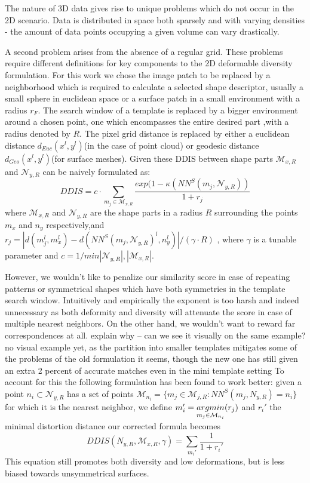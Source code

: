 \documentclass[10pt,twocolumn,letterpaper]{article}
\begin{document}
The nature of 3D data gives rise to unique problems which do not occur in the 2D scenario. Data is distributed in space both sparsely and with varying densities - the amount of data points occupying a given volume can vary drastically.

A second problem arises from the absence of a regular grid. These problems require different definitions for key components to the 2D deformable diversity formulation. For this work we chose the image patch to be replaced by a neighborhood which is required to calculate a selected shape descriptor, usually a small sphere in euclidean space or a surface patch in a small environment with a radius $r_F$. The search window  of a template is replaced by a bigger environment around a chosen point, one which encompasses the entire desired part ,with a radius denoted by $R$. The pixel grid distance is replaced by either a euclidean distance $d_{Euc}(x^l,y^l)$(in the case of point cloud) or geodesic distance $d_{Geo}(x^l,y^l)$(for surface meshes).
Given these DDIS  between shape parts $\mathcal{M}_{x,R}$ and $\mathcal{N}_{y,R}$ can be naively formulated as:
\begin{equation}
DDIS=c\cdot\sum_{m_j\in\mathcal{M}_{x,R}}\frac{exp(1-\kappa(NN^S(m_j,\mathcal{N}_{y,R}))}{1+r_j}
\end{equation}
where $\mathcal{M}_{x,R}$ and $\mathcal{N}_{y,R}$ are the shape parts in a radius $R$ surrounding the points $m_x$ and $n_y$ respectively,and $r_j=|d(m_j^l,m_x^l)-d(NN^S(m_j,\mathcal{N}_{y,R})^l,n_y^l)|/(\gamma\cdot R)$ , where $\gamma$ is a tunable parameter and $c=1/min{|\mathcal{N}_{y,R}|,|\mathcal{M}_{x,R}|}$.

However, we wouldn't like to penalize our similarity score in case of repeating patterns or symmetrical shapes which have both symmetries in the template search window. Intuitively and empirically the exponent is too harsh and indeed unnecessary as both deformity and diversity will attenuate the score in case of multiple nearest neighbors. On the other hand, we wouldn't want to reward far correspondences at all. 
{\color{red} explain why -- can we see it visually on the same example?}{\color{green} no visual example yet, as the partition into smaller templates mitigates some of the problems of the old formulation it seems, though the new one has still given an extra 2 percent of accurate matches even in the mini template setting}
To account for this the following formulation has been found to work better: given a point $n_i\subset \mathcal{N}_{y,R}$ has a set of points
$\mathcal{M}_{n_i}=\{m_j\in\mathcal{M}_{j,R}:NN^S(m_j,N_{y,R})=n_i\}$ 
for which it is the nearest neighbor, we define 
$m_i' = \underset{m_j\in\mathcal{M}_{n_i}}{argmin}\space (r_j)$
and $r_i'$ the minimal distortion distance our corrected formula becomes
\begin{equation}
DDIS(N_{y,R},\mathcal{M}_{x,R},\gamma)=\sum_{m_i'}\frac{1}{1+r_i'}
\end{equation}
This equation still promotes both diversity and low deformations, but is less biased towards unsymmetrical surfaces.
\end{document}
